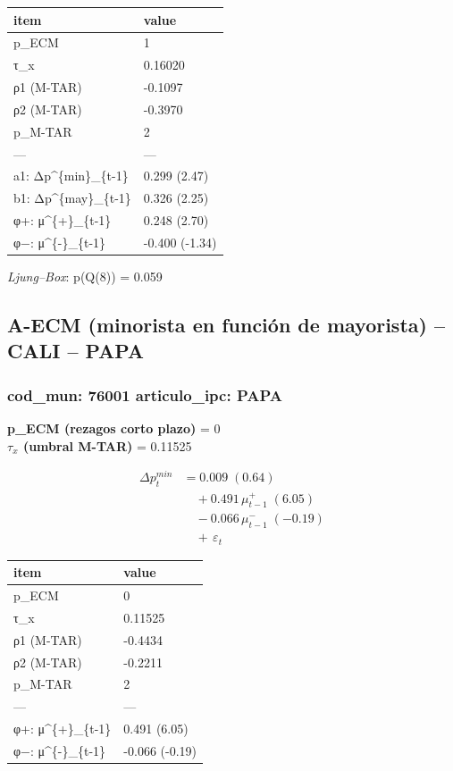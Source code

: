 \documentclass[
  12pt,
]{article}
\begin{document}
\begin{longtable}[t]{ll}
\toprule
item & value\\
\midrule
p\_ECM & 1\\
τ\_x & 0.16020\\
ρ1 (M-TAR) & -0.1097\\
ρ2 (M-TAR) & -0.3970\\
p\_M-TAR & 2\\
\addlinespace
— & —\\
a1: Δp\textasciicircum{}\{min\}\_\{t-1\} & 0.299 (2.47)\\
b1: Δp\textasciicircum{}\{may\}\_\{t-1\} & 0.326 (2.25)\\
φ+: μ\textasciicircum{}\{+\}\_\{t-1\} & 0.248 (2.70)\\
φ−: μ\textasciicircum{}\{-\}\_\{t-1\} & -0.400 (-1.34)\\
\bottomrule
\end{longtable}

\emph{Ljung--Box}: p(Q(8)) = 0.059

\subsection{A-ECM (minorista en función de mayorista) -- CALI --
PAPA}\label{a-ecm-minorista-en-funciuxf3n-de-mayorista-cali-papa}

\subsubsection{cod\_mun: 76001 \textbar{} articulo\_ipc:
PAPA}\label{cod_mun-76001-articulo_ipc-papa}

\textbf{p\_ECM (rezagos corto plazo)} = 0\\
\textbf{\(\tau_x\) (umbral M-TAR)} = 0.11525

\[
\begin{aligned}
\Delta p^{min}_{t} &= 0.009\;(0.64) \\
&\quad + 0.491\,\mu^{+}_{t-1}\;(6.05) \\
&\quad − 0.066\,\mu^{-}_{t-1}\;(-0.19) \\
&\quad +\, \varepsilon_t
\end{aligned}
\]

\begin{longtable}[t]{ll}
\toprule
item & value\\
\midrule
p\_ECM & 0\\
τ\_x & 0.11525\\
ρ1 (M-TAR) & -0.4434\\
ρ2 (M-TAR) & -0.2211\\
p\_M-TAR & 2\\
\addlinespace
— & —\\
φ+: μ\textasciicircum{}\{+\}\_\{t-1\} & 0.491 (6.05)\\
φ−: μ\textasciicircum{}\{-\}\_\{t-1\} & -0.066 (-0.19)\\
\bottomrule
\end{longtable}
\end{document}
